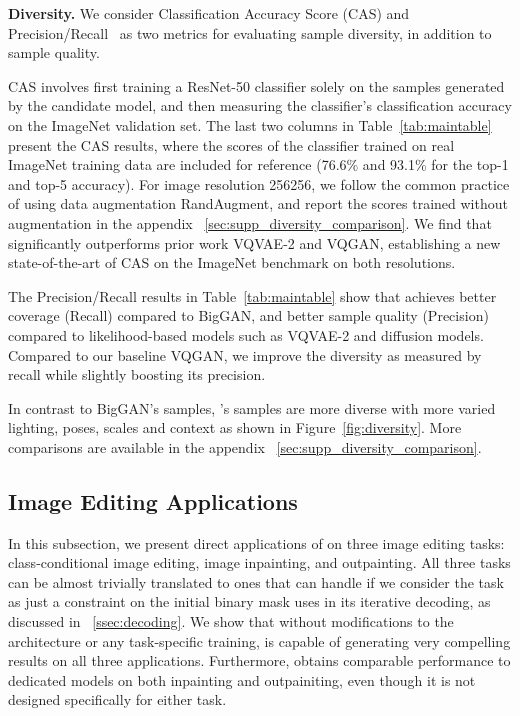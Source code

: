 \noindent\textbf{Diversity.} We consider Classification Accuracy Score (CAS) \cite{Ravuri19CAS} and Precision/Recall~\cite{KynkaanniemiKLL19} as two metrics for evaluating sample diversity, in addition to sample quality.

CAS involves first training a ResNet-50 classifier\cite{ResNet} solely on the samples generated by the candidate model, and then measuring the classifier's classification accuracy on the ImageNet validation set.
The last two columns in Table~\ref{tab:maintable} present the CAS results, where the scores of the classifier trained on real ImageNet training data are included for reference (76.6\% and 93.1\% for the top-1 and top-5 accuracy). For image resolution 256256,  we follow the common practice of using data augmentation RandAugment\cite{cubuk2019randaugment}, and report the scores trained without augmentation in the appendix ~\ref{sec:supp_diversity_comparison}. We find that \model significantly outperforms prior work VQVAE-2 and VQGAN, establishing a new state-of-the-art of CAS on the ImageNet benchmark on both resolutions.


The Precision/Recall results in Table~\ref{tab:maintable} show that \model achieves better coverage (Recall) compared to BigGAN, and better sample quality (Precision) compared to likelihood-based models such as VQVAE-2 and diffusion models. Compared to our baseline VQGAN, we improve the diversity as measured by recall while slightly boosting its precision. 

In contrast to BigGAN’s samples, \model's samples are more diverse with more varied lighting, poses, scales and context as shown in Figure~\ref{fig:diversity}. More comparisons are available in the appendix ~\ref{sec:supp_diversity_comparison}.

\subsection{Image Editing Applications}
\label{ssec:applications}
In this subsection, we present direct applications of \model on three image editing tasks: class-conditional image editing, image inpainting, and outpainting. All three tasks can be almost trivially translated to ones that \model can handle if we consider the task as just a constraint on the initial binary mask  \model uses in its iterative decoding, as discussed in ~\ref{ssec:decoding}. We show that without modifications to the architecture or any task-specific training, \model is capable of generating very compelling results on all three applications. Furthermore, \model obtains comparable performance to dedicated models on both inpainting and outpainiting, even though it is not designed specifically for either task.

